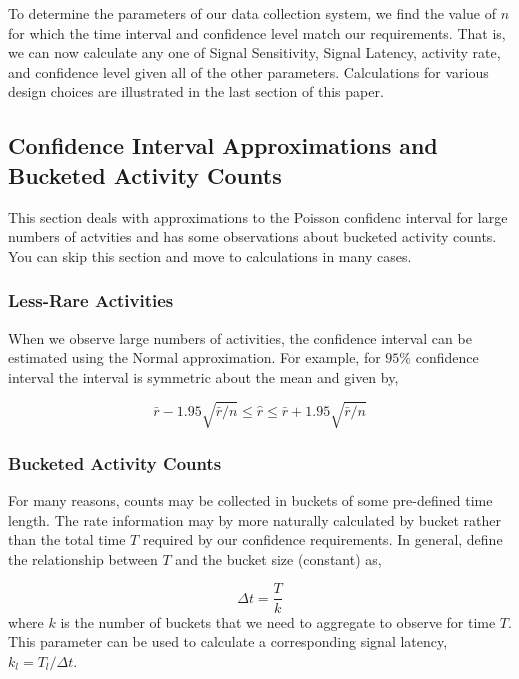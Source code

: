 \documentclass{article}
\begin{document}
To determine the parameters of our data collection system, we find the value of $n$ for which the time interval and confidence level match our requirements.  That is, we can now calculate any one of Signal Sensitivity, Signal Latency, activity rate, and confidence level given all of the other parameters. Calculations for various design choices are illustrated in the last section of this paper.

\subsection{Confidence Interval Approximations and Bucketed Activity Counts}

This section deals with approximations to the Poisson confidenc interval for large numbers of actvities and has some observations about bucketed activity counts. You can skip this section and move to calculations in many cases.


\subsubsection{Less-Rare Activities} 

When we observe large numbers of activities, the confidence interval can be estimated using the Normal approximation. For example, for $95\%$ confidence interval the interval is symmetric about the mean and given by,

\begin{equation}
    \label{eq:largenconf}
    \bar{r} - 1.95 \sqrt{\bar{r}/n} \leq \hat{r} \leq \bar{r} + 1.95 \sqrt{\bar{r}/n}
\end{equation}

\subsubsection{Bucketed Activity Counts}

For many reasons, counts may be collected in buckets of some pre-defined time length.  The rate information may by more naturally calculated by bucket rather than the total time $T$ required by our confidence requirements. In general, define the relationship between $T$ and the bucket size (constant) as,

\begin{equation}
    \label{eq:bucket}
    \Delta t = \frac{T}{k}
\end{equation}
where $k$ is the number of buckets that we need to aggregate to observe for time $T$. This parameter can be used to calculate a corresponding signal latency, $k_l = T_l/\Delta t$.
\end{document}

